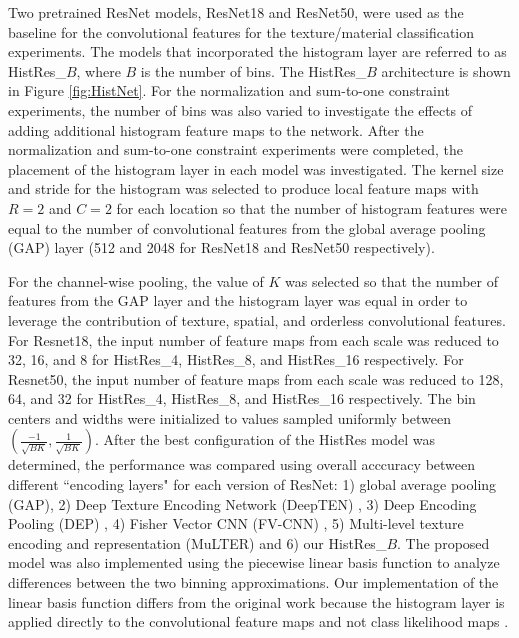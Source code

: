 \documentclass[journal]{IEEEtai}
\begin{document}
	Two pretrained ResNet models, ResNet18 and ResNet50, were used as the baseline for the convolutional features for the texture/material classification experiments. The models that incorporated the histogram layer are referred to as HistRes\_$B$, where $B$ is the number of bins. The HistRes\_$B$ architecture is shown in Figure \ref{fig:HistNet}. For the normalization and sum-to-one constraint experiments, the number of bins was also varied to investigate the effects of adding additional histogram feature maps to the network. After the normalization and sum-to-one constraint experiments were completed, the placement of the histogram layer in each model was investigated. The kernel size and stride for the histogram was selected to produce local feature maps with $R = 2$ and $C = 2$ for each location so that the number of histogram features were equal to the number of convolutional features from the global average pooling (GAP) layer (512 and 2048 for ResNet18 and ResNet50 respectively). 
	
	For the channel-wise pooling, the value of $K$ was selected so that the number of features from the GAP layer and the histogram layer was equal in order to leverage the contribution of texture, spatial, and orderless convolutional features. For Resnet18, the input number of feature maps from each scale was reduced to 32, 16, and 8 for HistRes\_4, HistRes\_8, and HistRes\_16 respectively. For Resnet50, the input number of feature maps from each scale was reduced to 128, 64, and 32 for HistRes\_4, HistRes\_8, and HistRes\_16 respectively. The bin centers and widths were initialized to values sampled uniformly between $\left(\frac{-1}{\sqrt{BK}},\frac{1}{\sqrt{BK}}\right)$. After the best configuration of the HistRes model was determined, the performance was compared using overall acccuracy between different ``encoding layers" for each version of ResNet: 1) global average pooling (GAP), 2) Deep Texture Encoding Network (DeepTEN) \cite{zhang2017deep}, 3) Deep Encoding Pooling (DEP) \cite{xue2018deep}, 4) Fisher Vector CNN (FV-CNN) \cite{cimpoi2015deep}, 5) Multi-level texture encoding and representation (MuLTER) \cite{hu2019multi} and 6) our HistRes\_$B$. The proposed model was also implemented using the piecewise linear basis function to analyze differences between the two binning approximations. Our implementation of the linear basis function differs from the original work because the histogram layer is applied directly to the convolutional feature maps and not class likelihood maps \cite{wang2016learnable}. 
\end{document}
